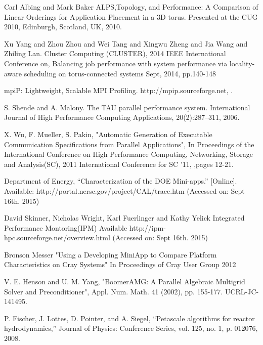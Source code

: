 \documentclass[conference]{IEEEtran}
\begin{document}
\begin{thebibliography}{10}
Carl Albing and Mark Baker
\newblock ALPS,Topology, and Performance: A Comparison of Linear Orderings for 
Application Placement in a 3D torus.
\newblock Presented at the CUG 2010, Edinburgh, Scotland, UK, 2010.

Xu Yang and Zhou Zhou and Wei Tang and Xingwu Zheng and Jia Wang and Zhiling Lan.
\newblock Cluster Computing (CLUSTER), 2014 IEEE International Conference on,
\newblock Balancing job performance with system performance via locality-aware scheduling on torus-connected systems
\newblock Sept, 2014,
\newblock pp.140-148

\newblock mpiP: Lightweight, Scalable MPI Profiling.
\newblock http://mpip.sourceforge.net, 
.

S. Shende and A. Malony. 
\newblock The TAU parallel performance system. 
\newblock International Journal of High Performance Computing Applications, 20(2):287–311, 2006.

X. Wu, F. Mueller, S. Pakin, 
\newblock "Automatic Generation of Executable Communication Specifications from Parallel Applications", 
\newblock In {Proceedings of the International Conference on High Performance Computing, Networking, Storage and Analysis(SC), 2011 International Conference for}
\newblock SC '11,
,pages 12-21.

Department of Energy, “Characterization of the DOE Mini-apps.” [Online].
\newblock Available: http://portal.nersc.gov/project/CAL/trace.htm
\newblock (Accessed on: Sept 16th. 2015)

David Skinner, Nicholas Wright, Karl Fuerlinger and Kathy Yelick
\newblock Integrated Performance Montoring(IPM)
\newblock Available http://ipm-hpc.sourceforge.net/overview.html
\newblock (Accessed on: Sept 16th. 2015)


Bronson Messer
\newblock "Using a Developing MiniApp to Compare Platform Characteristics on Cray Systems"
\newblock In Proceedings of Cray User Group 2012

V. E. Henson and U. M. Yang, 
\newblock "BoomerAMG: A Parallel Algebraic Multigrid Solver and Preconditioner",
\newblock Appl. Num. Math. 41 (2002), pp. 155-177. UCRL-JC-141495.

P. Fischer, J. Lottes, D. Pointer, and A. Siegel, 
\newblock “Petascale algorithms for reactor hydrodynamics,”
\newblock Journal of Physics: Conference Series, vol. 125, no. 1, p. 012076, 2008.


\end{thebibliography}
\end{document}
